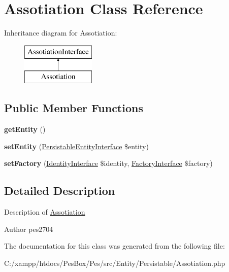 \hypertarget{class_pes_1_1_entity_1_1_persistable_1_1_assotiation}{}\section{Assotiation Class Reference}
\label{class_pes_1_1_entity_1_1_persistable_1_1_assotiation}
Inheritance diagram for Assotiation\+:\begin{figure}[H]
\begin{center}
\leavevmode
\includegraphics[height=2.000000cm]{class_pes_1_1_entity_1_1_persistable_1_1_assotiation}
\end{center}
\end{figure}
\subsection*{Public Member Functions}
\begin{DoxyCompactItemize}
\item 
\mbox{\label{class_pes_1_1_entity_1_1_persistable_1_1_assotiation_a0848c661e55b6027e3794d16cad5d501}} 
{\bfseries get\+Entity} ()
\item 
\mbox{\label{class_pes_1_1_entity_1_1_persistable_1_1_assotiation_acf40e0d478a8619df5c333c2149b043e}} 
{\bfseries set\+Entity} (\mbox{\hyperlink{interface_pes_1_1_entity_1_1_persistable_1_1_persistable_entity_interface}{Persistable\+Entity\+Interface}} \$entity)
\item 
\mbox{\label{class_pes_1_1_entity_1_1_persistable_1_1_assotiation_a3857b464b1fda4e7177ea6017c80ec26}} 
{\bfseries set\+Factory} (\mbox{\hyperlink{interface_pes_1_1_entity_1_1_persistable_1_1_identity_interface}{Identity\+Interface}} \$identity, \mbox{\hyperlink{interface_pes_1_1_entity_1_1_persistable_1_1_factory_1_1_factory_interface}{Factory\+Interface}} \$factory)
\end{DoxyCompactItemize}


\subsection{Detailed Description}
Description of \mbox{\hyperlink{class_pes_1_1_entity_1_1_persistable_1_1_assotiation}{Assotiation}}

\begin{DoxyAuthor}{Author}
pes2704 
\end{DoxyAuthor}


The documentation for this class was generated from the following file\+:\begin{DoxyCompactItemize}
\item 
C\+:/xampp/htdocs/\+Pes\+Box/\+Pes/src/\+Entity/\+Persistable/Assotiation.\+php\end{DoxyCompactItemize}
